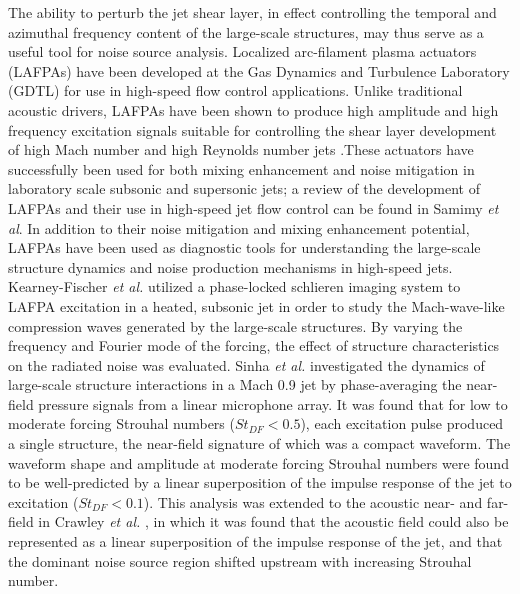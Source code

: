 \documentclass[english]{aiaa-tc}
\begin{document}
The ability to perturb the jet shear layer, in effect controlling the temporal and azimuthal frequency content of the large-scale structures, may thus serve as a useful tool for noise source analysis. Localized arc-filament plasma actuators (LAFPAs) have been developed at the Gas Dynamics and Turbulence Laboratory (GDTL) for use in high-speed flow control applications. Unlike traditional acoustic drivers, LAFPAs have been shown to produce high amplitude and high frequency excitation signals suitable for controlling the shear layer development of high Mach number and high Reynolds number jets \cite{sm2004-1,uyg2007-2,sm2007-2,sm2007-3}.These actuators have successfully been used for both mixing enhancement and noise mitigation in laboratory scale subsonic and supersonic jets; a review of the development of LAFPAs and their use in high-speed jet flow control can be found in Samimy \textit{et al}. \cite{Samimy2012} In addition to their noise mitigation and mixing enhancement potential, LAFPAs have been used as diagnostic tools for understanding the large-scale structure dynamics and noise production mechanisms in high-speed jets. Kearney-Fischer \textit{et al.} \cite{Kearney-Fischer2011a} utilized a phase-locked schlieren imaging system to LAFPA excitation in a heated, subsonic jet in order to study the Mach-wave-like compression waves generated by the large-scale structures. By varying the frequency and Fourier mode of the forcing, the effect of structure characteristics on the radiated noise was evaluated. Sinha \textit{et al.} \cite{sinha2013} investigated the dynamics of large-scale structure interactions in a Mach 0.9 jet by phase-averaging the near-field pressure signals from a linear microphone array. It was found that for low to moderate forcing Strouhal numbers ($St_{DF}  <  0.5$), each excitation pulse produced a single structure, the near-field signature of which was a compact waveform. The waveform shape and amplitude at moderate forcing Strouhal numbers were found to be well-predicted by a linear superposition of the impulse response of the jet to excitation ($St_{DF}  <  0.1$). This analysis was extended to the acoustic near- and far-field in Crawley \textit{et al.} \cite{Crawley2015}, in which it was found that the acoustic field could also be represented as a linear superposition of the impulse response of the jet, and that the dominant noise source region shifted upstream with increasing Strouhal number.
\end{document}
